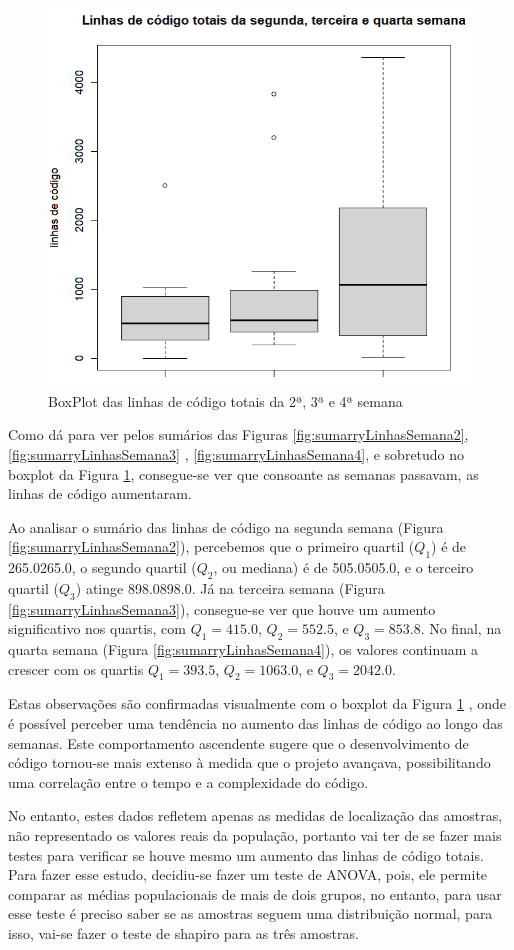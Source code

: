 \begin{figure}
    \centering
    \includegraphics[width=0.5\linewidth]{imagens//questao2/boxplotDas3Semanas.png}
    \caption{BoxPlot das linhas de código totais da 2ª, 3ª e 4ª semana}
    \label{fig:BoxPlotDas3Semanas}
\end{figure}

Como dá para ver pelos sumários das Figuras \ref{fig:sumarryLinhasSemana2}, \ref{fig:sumarryLinhasSemana3} , \ref{fig:sumarryLinhasSemana4},  e sobretudo no boxplot da Figura \ref{fig:BoxPlotDas3Semanas}, consegue-se ver que consoante as semanas passavam, as linhas de código aumentaram.

Ao analisar o sumário das linhas de código na segunda semana (Figura \ref{fig:sumarryLinhasSemana2}), percebemos que o primeiro quartil ($Q_1$) é de 265.0265.0, o segundo quartil ($Q_2$, ou mediana) é de 505.0505.0, e o terceiro quartil ($Q_3$) atinge 898.0898.0. Já na terceira semana (Figura \ref{fig:sumarryLinhasSemana3}), consegue-se ver que houve um aumento significativo nos quartis, com $Q_1=415.0$, $Q_2=552.5$, e $Q_3=853.8$. No final, na quarta semana (Figura \ref{fig:sumarryLinhasSemana4}), os valores continuam a crescer com os quartis $Q_1=393.5$, $Q_2=1063.0$, e $Q_3=2042.0$.

Estas observações são confirmadas visualmente com o boxplot da Figura \ref {fig:BoxPlotDas3Semanas} , onde é possível perceber uma tendência no aumento das linhas de código ao longo das semanas. Este comportamento ascendente sugere que o desenvolvimento de código tornou-se mais extenso à medida que o projeto avançava, possibilitando uma correlação entre o tempo e a complexidade do código.

No entanto, estes dados refletem apenas as medidas de localização das amostras, não representado os valores reais da população, portanto vai ter de se fazer mais testes para verificar se houve mesmo um aumento das linhas de código totais. Para fazer esse estudo, decidiu-se fazer um teste de ANOVA, pois, ele permite comparar as médias populacionais de mais de dois grupos, no entanto, para usar esse teste é preciso saber se as amostras seguem uma distribuição normal, para isso, vai-se fazer o teste de shapiro para as três amostras.

